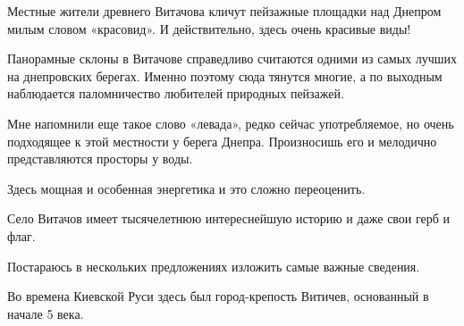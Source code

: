 \raggedcolumns
\begin{multicols}{3} %
\setlength{\parindent}{0pt}








\end{multicols} %

Местные жители древнего Витачова кличут пейзажные площадки над Днепром милым
словом «красовид». И действительно, здесь очень красивые виды!

Панорамные склоны в Витачове справедливо считаются одними из самых лучших на
днепровских берегах. Именно поэтому сюда тянутся многие, а по выходным
наблюдается паломничество любителей природных пейзажей. 


Мне напомнили еще такое слово «левада», редко сейчас употребляемое, но очень
подходящее к этой местности у берега Днепра. Произносишь его и мелодично
представляются просторы у воды. 

Здесь мощная и особенная  энергетика и это  сложно переоценить. 

Село Витачов имеет тысячелетнюю интереснейшую историю и даже свои герб и флаг.

Постараюсь в нескольких предложениях изложить самые важные сведения.

Во времена Киевской Руси здесь был город-крепость Витичев, основанный в начале
5 века. 

\raggedcolumns
\begin{multicols}{3} %
\setlength{\parindent}{0pt}




\end{multicols} %

